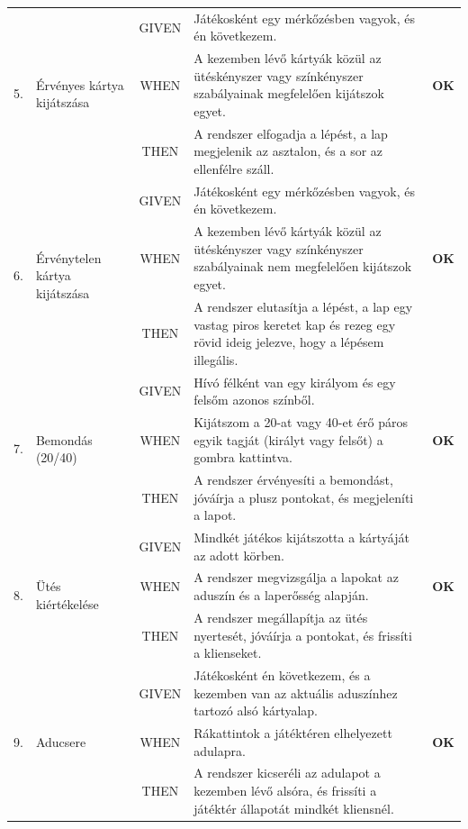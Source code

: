 \begin{longtable}{| c | m{3cm} | c | m{6cm} | c |}
    \multirow{3}{*}{5.} & \multirow{3}{3cm}{Érvényes kártya kijátszása} 
    & GIVEN & Játékosként egy mérkőzésben vagyok, és én következem. & \cellcolor{green!40} \\* \cline{3-4}
    & & WHEN & A kezemben lévő kártyák közül az ütéskényszer vagy színkényszer szabályainak megfelelően kijátszok egyet. & \cellcolor{green!40}\textbf{OK} \\* \cline{3-4}
    & & THEN & A rendszer elfogadja a lépést, a lap megjelenik az asztalon, és a sor az ellenfélre száll. & \cellcolor{green!40} \\ \hline

    \multirow{3}{*}{6.} & \multirow{3}{3cm}{Érvénytelen kártya kijátszása} 
    & GIVEN & Játékosként egy mérkőzésben vagyok, és én következem. & \cellcolor{green!40} \\* \cline{3-4}
    & & WHEN & A kezemben lévő kártyák közül az ütéskényszer vagy színkényszer szabályainak nem megfelelően kijátszok egyet. & \cellcolor{green!40}\textbf{OK} \\* \cline{3-4}
    & & THEN & A rendszer elutasítja a lépést, a lap egy vastag piros keretet kap és rezeg egy rövid ideig jelezve, hogy a lépésem illegális. & \cellcolor{green!40} \\ \hline

    \multirow{3}{*}{7.} & \multirow{3}{3cm}{Bemondás (20/40)} 
    & GIVEN & Hívó félként van egy királyom és egy felsőm azonos színből. & \cellcolor{green!40} \\* \cline{3-4}
    & & WHEN & Kijátszom a 20-at vagy 40-et érő páros egyik tagját (királyt vagy felsőt) a gombra kattintva. & \cellcolor{green!40}\textbf{OK} \\* \cline{3-4}
    & & THEN & A rendszer érvényesíti a bemondást, jóváírja a plusz pontokat, és megjeleníti a lapot. & \cellcolor{green!40} \\ \hline

    \multirow{3}{*}{8.} & \multirow{3}{3cm}{Ütés kiértékelése} 
    & GIVEN & Mindkét játékos kijátszotta a kártyáját az adott körben. & \cellcolor{green!40} \\* \cline{3-4}
    & & WHEN & A rendszer megvizsgálja a lapokat az aduszín és a laperősség alapján. & \cellcolor{green!40}\textbf{OK} \\* \cline{3-4}
    & & THEN & A rendszer megállapítja az ütés nyertesét, jóváírja a pontokat, és frissíti a klienseket. & \cellcolor{green!40} \\ \hline

    \multirow{3}{*}{9.} & \multirow{3}{3cm}{Aducsere} 
    & GIVEN & Játékosként én következem, és a kezemben van az aktuális aduszínhez tartozó alsó kártyalap. & \cellcolor{green!40} \\* \cline{3-4}
    & & WHEN & Rákattintok a játéktéren elhelyezett adulapra. & \cellcolor{green!40}\textbf{OK} \\* \cline{3-4}
    & & THEN & A rendszer kicseréli az adulapot a kezemben lévő alsóra, és frissíti a játéktér állapotát mindkét kliensnél. & \cellcolor{green!40} \\ \hline


\end{longtable}
